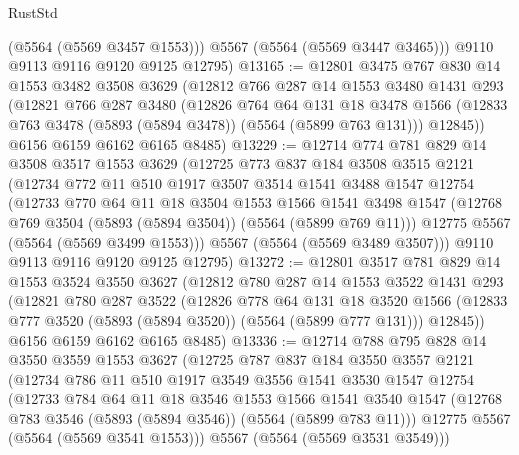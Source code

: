 \begin{lexlean}{RustStd}
\begin{coremodule}
          (@5564 (@5569 @3457 @1553)))
        @5567
        (@5564 (@5569 @3447 @3465)))
      @9110
      @9113
      @9116
      @9120
      @9125
      @12795)
@13165 := @12801
    @3475
    @767
    @830
    @14
    @1553
    @3482
    @3508
    @3629
    (@12812
      @766
      @287
      @14
      @1553
      @3480
      @1431
      @293
      (@12821
        @766
        @287
        @3480
        (@12826
          @764
          @64
          @131
          @18
          @3478
          @1566
          (@12833 @763 @3478 (@5893 (@5894 @3478)) (@5564 (@5899 @763 @131)))
          @12845))
      @6156
      @6159
      @6162
      @6165
      @8485)
@13229 := @12714
    @774
    @781
    @829
    @14
    @3508
    @3517
    @1553
    @3629
    (@12725
      @773
      @837
      @184
      @3508
      @3515
      @2121
      (@12734
        @772
        @11
        @510
        @1917
        @3507
        @3514
        @1541
        @3488
        @1547
        @12754
        (@12733
          @770
          @64
          @11
          @18
          @3504
          @1553
          @1566
          @1541
          @3498
          @1547
          (@12768 @769 @3504 (@5893 (@5894 @3504)) (@5564 (@5899 @769 @11)))
          @12775
          @5567
          (@5564 (@5569 @3499 @1553)))
        @5567
        (@5564 (@5569 @3489 @3507)))
      @9110
      @9113
      @9116
      @9120
      @9125
      @12795)
@13272 := @12801
    @3517
    @781
    @829
    @14
    @1553
    @3524
    @3550
    @3627
    (@12812
      @780
      @287
      @14
      @1553
      @3522
      @1431
      @293
      (@12821
        @780
        @287
        @3522
        (@12826
          @778
          @64
          @131
          @18
          @3520
          @1566
          (@12833 @777 @3520 (@5893 (@5894 @3520)) (@5564 (@5899 @777 @131)))
          @12845))
      @6156
      @6159
      @6162
      @6165
      @8485)
@13336 := @12714
    @788
    @795
    @828
    @14
    @3550
    @3559
    @1553
    @3627
    (@12725
      @787
      @837
      @184
      @3550
      @3557
      @2121
      (@12734
        @786
        @11
        @510
        @1917
        @3549
        @3556
        @1541
        @3530
        @1547
        @12754
        (@12733
          @784
          @64
          @11
          @18
          @3546
          @1553
          @1566
          @1541
          @3540
          @1547
          (@12768 @783 @3546 (@5893 (@5894 @3546)) (@5564 (@5899 @783 @11)))
          @12775
          @5567
          (@5564 (@5569 @3541 @1553)))
        @5567
        (@5564 (@5569 @3531 @3549)))

\end{coremodule}
\end{lexlean}

